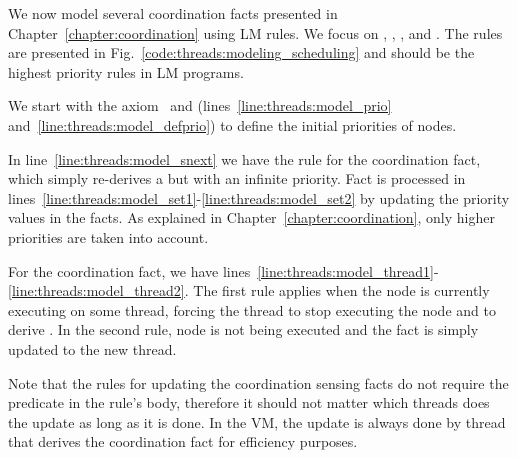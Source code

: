 We now model several coordination facts presented in
Chapter~\ref{chapter:coordination} using LM rules. We focus on
, , , and
. The rules are presented in
Fig.~\ref{code:threads:modeling_scheduling} and should be the highest priority
rules in LM programs.

We start with the axiom~ and
(lines~\ref{line:threads:model_prio} and~\ref{line:threads:model_defprio}) to
define the initial priorities of nodes.

In line~\ref{line:threads:model_snext} we have the rule for the
 coordination fact, which simply re-derives a
 but with an infinite priority. Fact  is
processed in lines~\ref{line:threads:model_set1}-\ref{line:threads:model_set2}
by updating the priority values in the  facts. As explained in
Chapter~\ref{chapter:coordination}, only higher priorities are taken into
account.

For the  coordination fact, we have
lines~\ref{line:threads:model_thread1}-\ref{line:threads:model_thread2}. The
first rule applies when the node is currently executing on some thread, forcing
the thread to stop executing the node and to derive . In the
second rule, node  is not being executed and the  fact is
simply updated to the new thread.

Note that the rules for updating the coordination sensing facts do not require
the  predicate in the rule's body, therefore it should not matter
which threads does the update as long as it is done. In the VM, the update is
always done by thread that derives the coordination fact for efficiency
purposes.

